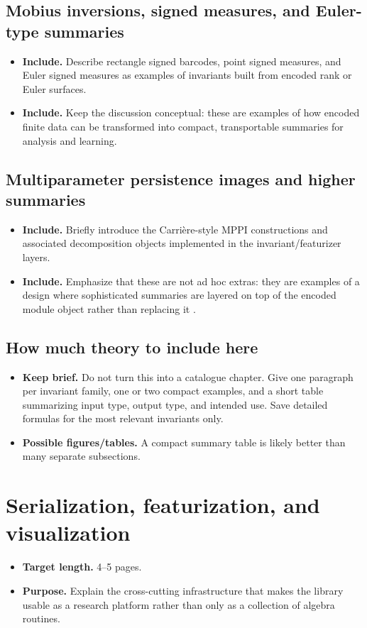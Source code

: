 \documentclass[11pt]{article}
\newenvironment{plan}{\begin{itemize}[leftmargin=1.6em,itemsep=0.35em,topsep=0.25em]}{\end{itemize}}
\newcommand{\target}[1]{\item \textbf{Target length.} #1}
\newcommand{\purpose}[1]{\item \textbf{Purpose.} #1}
\newcommand{\includeitems}[1]{\item \textbf{Include.} #1}
\newcommand{\keepbrief}[1]{\item \textbf{Keep brief.} #1}
\newcommand{\figures}[1]{\item \textbf{Possible figures/tables.} #1}
\begin{document}
\subsection{Mobius inversions, signed measures, and Euler-type summaries}

\begin{plan}
    \includeitems{Describe rectangle signed barcodes, point signed measures, and Euler signed measures as examples of invariants built from encoded rank or Euler surfaces.}
    \includeitems{Keep the discussion conceptual: these are examples of how encoded finite data can be transformed into compact, transportable summaries for analysis and learning.}
\end{plan}

\subsection{Multiparameter persistence images and higher summaries}

\begin{plan}
    \includeitems{Briefly introduce the Carri\`ere-style MPPI constructions and associated decomposition objects implemented in the invariant/featurizer layers.}
    \includeitems{Emphasize that these are not ad hoc extras: they are examples of a design where sophisticated summaries are layered on top of the encoded module object rather than replacing it \cite{LS24}.}
\end{plan}

\subsection{How much theory to include here}

\begin{plan}
    \keepbrief{Do not turn this into a catalogue chapter. Give one paragraph per invariant family, one or two compact examples, and a short table summarizing input type, output type, and intended use. Save detailed formulas for the most relevant invariants only.}
    \figures{A compact summary table is likely better than many separate subsections.}
\end{plan}

\section{Serialization, featurization, and visualization}\label{sec:cross-cutting-layers}

\begin{plan}
    \target{4--5 pages.}
    \purpose{Explain the cross-cutting infrastructure that makes the library usable as a research platform rather than only as a collection of algebra routines.}
\end{plan}
\end{document}
